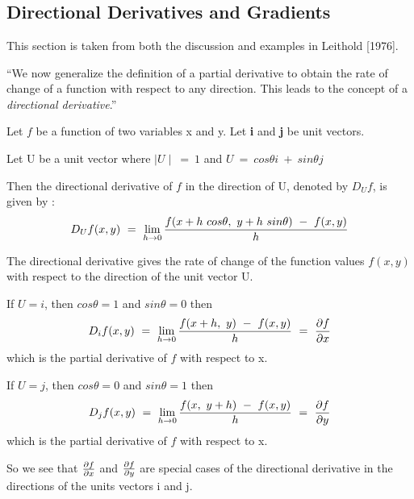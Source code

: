 \parskip 0.20in
\textheight 8.75in
\textwidth 6.0in
\topmargin -0.25in
\oddsidemargin 0.40in
\appendix

\baselineskip 0.30in

\setcounter{page}{54}
\setcounter{chapter}{1}

\chapter{}

\section{Directional Derivatives and Gradients}

	This section is taken from both the discussion and examples
in Leithold [1976].

	``We now generalize the definition of a partial derivative to
obtain the rate of change of a function with respect to any direction.
This leads to the concept of a {\it directional derivative}.''

	Let $f$ be a function of two variables x and y.
        Let {\bf i} and {\bf j} be unit vectors.

	Let U be a unit vector where $\mid U \mid\  =\  1$ and $U\  =\  cos
\theta i\  +\  sin \theta j$

	Then the directional derivative of $f$ in the direction of U,
denoted by $D_Uf$, is given by :
	$$D_U f(x,y)\  =\  \lim_{h\to0}{f(x + h\  cos \theta,\  y + h\  sin
\theta)\  -\  f(x,y) \over h}$$

	The directional derivative gives the rate of change of the
function values $f(x,y)$ with respect to the direction of the unit
vector U.

	If $U = i$, then $cos \theta = 1$ and $sin \theta = 0$ then
        $$D_i f(x,y)\  =\  \lim_{h\to0} {f(x + h,\ y)\  -\  f(x,y) \over
h}\  =\  {\partial f \over \partial x}$$
which is the partial derivative of $f$ with respect to x.

	If $U = j$, then $cos \theta = 0$ and $sin \theta = 1$ then
        $$D_j f(x,y)\  =\  \lim_{h\to0} {f(x,\  y + h)\  -\  f(x,y) \over
h}\  =\  {\partial f \over \partial y}$$
which is the partial derivative of $f$ with respect to x.  

	So we see that $\partial f \over \partial x$ and $\partial f
\over \partial y$ are special cases of the directional derivative in
the directions of the units vectors i and j.

